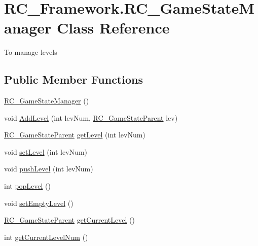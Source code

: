 \hypertarget{class_r_c___framework_1_1_r_c___game_state_manager}{}\section{R\+C\+\_\+\+Framework.\+R\+C\+\_\+\+Game\+State\+Manager Class Reference}
\label{class_r_c___framework_1_1_r_c___game_state_manager}


To manage levels ~\newline
 


\subsection*{Public Member Functions}
\begin{DoxyCompactItemize}
\item 
\mbox{\hyperlink{class_r_c___framework_1_1_r_c___game_state_manager_a481a415ee368710463d773ecffc69a26}{R\+C\+\_\+\+Game\+State\+Manager}} ()
\item 
void \mbox{\hyperlink{class_r_c___framework_1_1_r_c___game_state_manager_abc201bbd33d01162573ae56bb8821532}{Add\+Level}} (int lev\+Num, \mbox{\hyperlink{class_r_c___framework_1_1_r_c___game_state_parent}{R\+C\+\_\+\+Game\+State\+Parent}} lev)
\item 
\mbox{\hyperlink{class_r_c___framework_1_1_r_c___game_state_parent}{R\+C\+\_\+\+Game\+State\+Parent}} \mbox{\hyperlink{class_r_c___framework_1_1_r_c___game_state_manager_a6e4402df19c3f71484c99a79465776a9}{get\+Level}} (int lev\+Num)
\item 
void \mbox{\hyperlink{class_r_c___framework_1_1_r_c___game_state_manager_abc013de4037dfb71de3c641370bf95e1}{set\+Level}} (int lev\+Num)
\item 
void \mbox{\hyperlink{class_r_c___framework_1_1_r_c___game_state_manager_a608feb785ba1237cd73e4d923ba0c984}{push\+Level}} (int lev\+Num)
\item 
int \mbox{\hyperlink{class_r_c___framework_1_1_r_c___game_state_manager_a6f0a705a4cf67f540c8b3b6b05ebf908}{pop\+Level}} ()
\item 
void \mbox{\hyperlink{class_r_c___framework_1_1_r_c___game_state_manager_aa499f3ee8c7b4e013039ef9a895b7bff}{set\+Empty\+Level}} ()
\item 
\mbox{\hyperlink{class_r_c___framework_1_1_r_c___game_state_parent}{R\+C\+\_\+\+Game\+State\+Parent}} \mbox{\hyperlink{class_r_c___framework_1_1_r_c___game_state_manager_a5f86142eb931e571ae1116d8be88bcab}{get\+Current\+Level}} ()
\item 
int \mbox{\hyperlink{class_r_c___framework_1_1_r_c___game_state_manager_ada1ef603c6e9c1d7d40977500e4191d3}{get\+Current\+Level\+Num}} ()
\end{DoxyCompactItemize}
